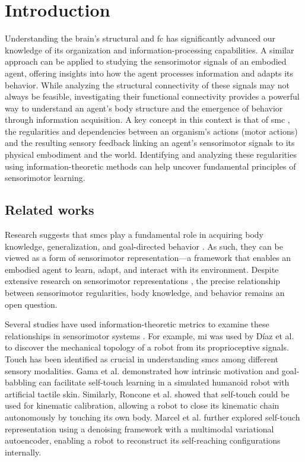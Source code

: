 \section{Introduction}\label{sec:intro}
Understanding the brain’s structural and \ac{fc} has significantly advanced our knowledge of its organization and information-processing capabilities. A similar approach can be applied to studying the sensorimotor signals of an embodied agent, offering insights into how the agent processes information and adapts its behavior. While analyzing the structural connectivity of these signals may not always be feasible, investigating their functional connectivity provides a powerful way to understand an agent’s body structure and the emergence of behavior through information acquisition. A key concept in this context is that of \ac{smc} \cite{oregan2001sensorimotor}, the regularities and dependencies between an organism's actions (motor actions) and the resulting sensory feedback linking an agent’s sensorimotor signals to its physical embodiment and the world. Identifying and analyzing these regularities using information-theoretic methods can help uncover fundamental principles of sensorimotor learning. 


\subsection{Related works}
Research suggests that \acp{smc} play a fundamental role in acquiring body knowledge, generalization, and goal-directed behavior \cite{Jacquey2019Sensorimotorcontingenciesas}. As such, they can be viewed as a form of sensorimotor representation---a framework that enables an embodied agent to learn, adapt, and interact with its environment. Despite extensive research on sensorimotor representations \cite{Nguyen2021Sensorimotorrepresentationlearning}, the precise relationship between sensorimotor regularities, body knowledge, and behavior remains an open question.

Several studies have used information-theoretic metrics to examine these relationships in sensorimotor systems \cite{Schmidt2013Bootstrappingperceptionusing,Lungarella2006Mappinginformationflow,Polani2009Modelsinformationprocessing,Bossomaier2016introductiontransferentropy,Olsson2006unknownsensorsactuators}. For example, \ac{mi} was used by D\'iaz et al. \cite{DiazLedezma2023MachineLS} to discover the mechanical topology of a robot from its proprioceptive signals. Touch has been identified as crucial in understanding \acp{smc} among different sensory modalities. Gama et al. \cite{Gama2021Goaldirectedtactile} demonstrated how intrinsic motivation and goal-babbling can facilitate self-touch learning in a simulated humanoid robot with artificial tactile skin. Similarly, Roncone et al. \cite{Roncone2014Automatickinematicchain} showed that self-touch could be used for kinematic calibration, allowing a robot to close its kinematic chain autonomously by touching its own body. Marcel et al. \cite{Marcel2022Learningreachown} further explored self-touch representation using a denoising framework with a multimodal variational autoencoder, enabling a robot to reconstruct its self-reaching configurations internally.

